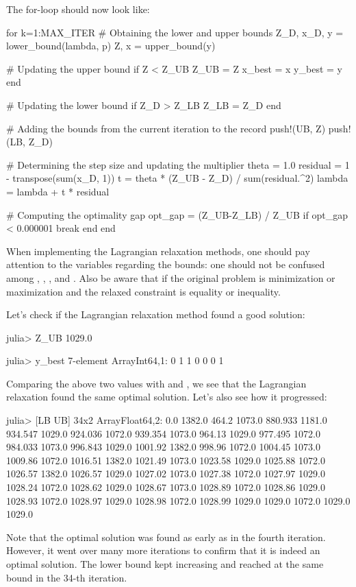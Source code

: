 The for-loop should now look like:
\begin{code}
for k=1:MAX_ITER
    # Obtaining the lower and upper bounds
    Z_D, x_D, y = lower_bound(lambda, p)
    Z, x = upper_bound(y)

    # Updating the upper bound
    if Z < Z_UB
        Z_UB = Z
        x_best = x
        y_best = y
    end

    # Updating the lower bound
    if Z_D > Z_LB
        Z_LB = Z_D
    end

    # Adding the bounds from the current iteration to the record
    push!(UB, Z)
    push!(LB, Z_D)

    # Determining the step size and updating the multiplier
    theta = 1.0
    residual = 1 - transpose(sum(x_D, 1))
    t = theta * (Z_UB - Z_D) / sum(residual.^2)
    lambda = lambda + t * residual

    # Computing the optimality gap
    opt_gap = (Z_UB-Z_LB) / Z_UB
    if opt_gap < 0.000001
        break
    end
end
\end{code}
\noindent When implementing the Lagrangian relaxation methods, one should pay attention to the variables regarding the bounds: one should not be confused among , , , and . Also be aware that if the original problem is minimization or maximization and the relaxed constraint is equality or inequality.

Let's check if the Lagrangian relaxation method found a good solution:
\begin{code}
julia> Z_UB
1029.0

julia> y_best
7-element Array{Int64,1}:
 0
 1
 1
 0
 0
 0
 1
\end{code}
\noindent Comparing the above two values with  and , we see that the Lagrangian relaxation found the same optimal solution. Let's also see how it progressed:
\begin{code}
julia> [LB UB]
34x2 Array{Float64,2}:
    0.0    1382.0
  464.2    1073.0
  880.933  1181.0
  934.547  1029.0
  924.036  1072.0
  939.354  1073.0
  964.13   1029.0
  977.495  1072.0
  984.033  1073.0
  996.843  1029.0
 1001.92   1382.0
  998.96   1072.0
 1004.45   1073.0
 1009.86   1072.0
 1016.51   1382.0
 1021.49   1073.0
 1023.58   1029.0
 1025.88   1072.0
 1026.57   1382.0
 1026.57   1029.0
 1027.02   1073.0
 1027.38   1072.0
 1027.97   1029.0
 1028.24   1072.0
 1028.62   1029.0
 1028.67   1073.0
 1028.89   1072.0
 1028.86   1029.0
 1028.93   1072.0
 1028.97   1029.0
 1028.98   1072.0
 1028.99   1029.0
 1029.0    1072.0
 1029.0    1029.0
\end{code}
\noindent Note that the optimal solution was found as early as in the fourth iteration. However, it went over many more iterations to confirm that it is indeed an optimal solution. The lower bound kept increasing and reached at the same bound in the 34-th iteration.

